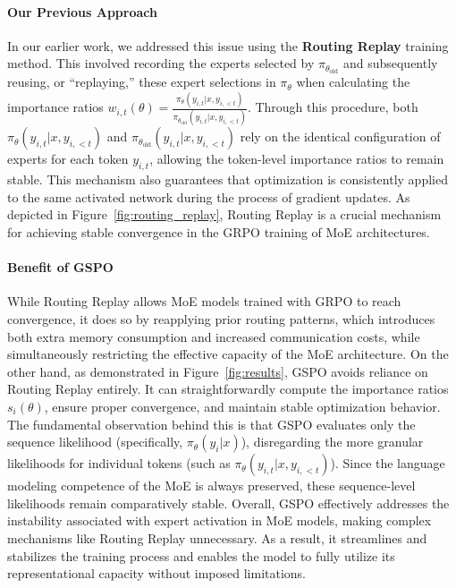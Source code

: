 \paragraph{Our Previous Approach} In our earlier work, we addressed this issue using the \textbf{Routing Replay} training method. This involved recording the experts selected by $\pi_{\theta_\text{old}}$ and subsequently reusing, or ``replaying,'' these expert selections in $\pi_{\theta}$ when calculating the importance ratios $w_{i,t}(\theta) = \frac{ \pi_{\theta} (y_{i,t} | x, y_{i,<t}) }{ \pi_{\theta_\text{old}} (y_{i,t} | x,y_{i,<t})}$. Through this procedure, both $\pi_{\theta} (y_{i,t} | x, y_{i,<t})$ and $\pi_{\theta_\text{old}} (y_{i,t} | x,y_{i,<t})$ rely on the identical configuration of experts for each token $y_{i,t}$, allowing the token-level importance ratios to remain stable. This mechanism also guarantees that optimization is consistently applied to the same activated network during the process of gradient updates. As depicted in Figure~\ref{fig:routing_replay}, Routing Replay is a crucial mechanism for achieving stable convergence in the GRPO training of MoE architectures.

\paragraph{Benefit of GSPO} While Routing Replay allows MoE models trained with GRPO to reach convergence, it does so by reapplying prior routing patterns, which introduces both extra memory consumption and increased communication costs, while simultaneously restricting the effective capacity of the MoE architecture. On the other hand, as demonstrated in Figure~\ref{fig:results}, GSPO avoids reliance on Routing Replay entirely. It can straightforwardly compute the importance ratios $s_i(\theta)$, ensure proper convergence, and maintain stable optimization behavior. The fundamental observation behind this is that GSPO evaluates only the sequence likelihood (specifically, $\pi_{\theta} (y_i | x)$), disregarding the more granular likelihoods for individual tokens (such as $\pi_{\theta} (y_{i,t} | x, y_{i,<t})$). Since the language modeling competence of the MoE is always preserved, these sequence-level likelihoods remain comparatively stable. Overall, GSPO effectively addresses the instability associated with expert activation in MoE models, making complex mechanisms like Routing Replay unnecessary. As a result, it streamlines and stabilizes the training process and enables the model to fully utilize its representational capacity without imposed limitations.

